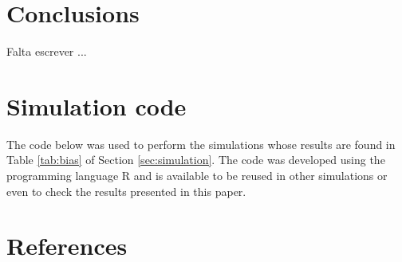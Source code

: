 \documentclass[12pt,a4paper]{article} %
\begin{document}
\section{Conclusions}\label{conclusions}

Falta escrever ...


\appendix

\section{Simulation code}\label{ap:simulation}

The code below was used to perform the simulations whose results are found in Table \ref{tab:bias} of Section \ref{sec:simulation}. The code was developed using the programming language R and is available to be reused in other simulations or even to check the results presented in this paper.




\section*{References}
\end{document}
